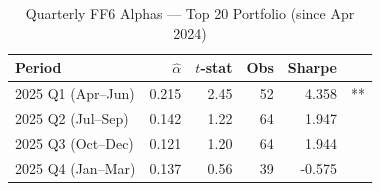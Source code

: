 \begin{table}[htbp]\centering
\caption{Quarterly FF6 Alphas — Top 20 Portfolio (since Apr 2024)}
\label{tab:alpha_quarterly}
\begin{tabular}{lrrrrl}
\toprule
Period & $\hat{\alpha}$ & $t$-stat & Obs & Sharpe & \\
\midrule
2025 Q1 (Apr–Jun) & 0.215 & 2.45 & 52 & 4.358 & ** \\
2025 Q2 (Jul–Sep) & 0.142 & 1.22 & 64 & 1.947 &  \\
2025 Q3 (Oct–Dec) & 0.121 & 1.20 & 64 & 1.944 &  \\
2025 Q4 (Jan–Mar) & 0.137 & 0.56 & 39 & -0.575 &  \\
\bottomrule
\end{tabular}
\end{table}